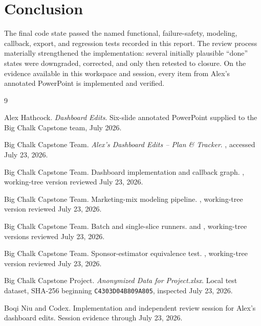 \documentclass[11pt]{article}
\begin{document}
\section{Conclusion}

The final code state passed the named functional, failure-safety, modeling, callback, export, and regression tests recorded in this report. The review process materially strengthened the implementation: several initially plausible ``done'' states were downgraded, corrected, and only then retested to closure. On the evidence available in this workspace and session, every item from Alex's annotated PowerPoint is implemented and verified.

\clearpage
\begin{thebibliography}{9}

Alex Hathcock.
\newblock \emph{Dashboard Edits}.
\newblock Six-slide annotated PowerPoint supplied to the Big Chalk Capstone team, July 2026.

Big Chalk Capstone Team.
\newblock \emph{Alex's Dashboard Edits -- Plan \& Tracker}.
\newblock {}, accessed July 23, 2026.

Big Chalk Capstone Team.
\newblock Dashboard implementation and callback graph.
\newblock {}, working-tree version reviewed July 23, 2026.

Big Chalk Capstone Team.
\newblock Marketing-mix modeling pipeline.
\newblock {}, working-tree version reviewed July 23, 2026.

Big Chalk Capstone Team.
\newblock Batch and single-slice runners.
\newblock {} and , working-tree versions reviewed July 23, 2026.

Big Chalk Capstone Team.
\newblock Sponsor-estimator equivalence test.
\newblock {}, working-tree version reviewed July 23, 2026.

Big Chalk Capstone Project.
\newblock \emph{Anonymized Data for Project.xlsx}.
\newblock Local test dataset, SHA-256 beginning \texttt{C4303D04B809A805}, inspected July 23, 2026.

Boqi Niu and Codex.
\newblock Implementation and independent review session for Alex's dashboard edits.
\newblock Session evidence through July 23, 2026.

\end{thebibliography}
\end{document}
